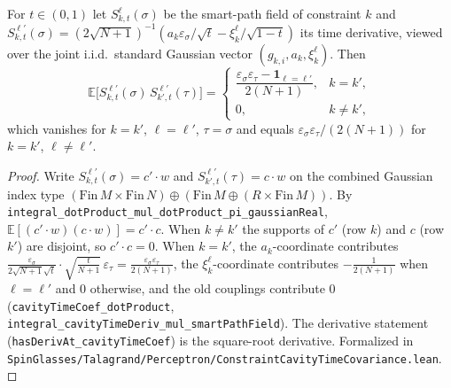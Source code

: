 \begin{lemma}\label{lem:sg-tal:perceptron-time-covariance}
  \leanok
For $t\in(0,1)$ let $S^\ell_{k,t}(\sigma)$ be the smart-path field of constraint $k$ and $S^{\ell\prime}_{k,t}(\sigma)=(2\sqrt{N+1})^{-1}(a_k\varepsilon_\sigma/\sqrt t-\xi^\ell_k/\sqrt{1-t})$ its time derivative, viewed over the joint i.i.d.\ standard Gaussian vector $(g_{k,i},a_k,\xi^\ell_k)$. Then
\[
\mathbb E\bigl[S^{\ell\prime}_{k,t}(\sigma)\,S^{\ell'}_{k',t}(\tau)\bigr]
 =\begin{cases}
   \dfrac{\varepsilon_\sigma\varepsilon_\tau-\mathbf 1_{\ell=\ell'}}{2(N+1)}, & k=k',\\
   0, & k\ne k',
  \end{cases}
\]
which vanishes for $k=k'$, $\ell=\ell'$, $\tau=\sigma$ and equals $\varepsilon_\sigma\varepsilon_\tau/(2(N+1))$ for $k=k'$, $\ell\ne\ell'$.
\end{lemma}
\begin{proof}
  \leanok
Write $S^{\ell\prime}_{k,t}(\sigma)=c'\cdot w$ and $S^{\ell'}_{k',t}(\tau)=c\cdot w$ on the combined Gaussian index type $(\mathrm{Fin}\,M\times\mathrm{Fin}\,N)\oplus(\mathrm{Fin}\,M\oplus(R\times\mathrm{Fin}\,M))$. By \texttt{integral\_dotProduct\_mul\_dotProduct\_pi\_gaussianReal}, $\mathbb E[(c'\cdot w)(c\cdot w)]=c'\cdot c$. When $k\ne k'$ the supports of $c'$ (row $k$) and $c$ (row $k'$) are disjoint, so $c'\cdot c=0$. When $k=k'$, the $a_k$-coordinate contributes $\frac{\varepsilon_\sigma}{2\sqrt{N+1}\sqrt t}\cdot\sqrt{\tfrac t{N+1}}\,\varepsilon_\tau=\frac{\varepsilon_\sigma\varepsilon_\tau}{2(N+1)}$, the $\xi^\ell_k$-coordinate contributes $-\frac1{2(N+1)}$ when $\ell=\ell'$ and $0$ otherwise, and the old couplings contribute $0$ (\texttt{cavityTimeCoef\_dotProduct}, \texttt{integral\_cavityTimeDeriv\_mul\_smartPathField}). The derivative statement (\texttt{hasDerivAt\_cavityTimeCoef}) is the square-root derivative.
Formalized in \texttt{SpinGlasses/Talagrand/Perceptron/ConstraintCavityTimeCovariance.lean}.
\end{proof}

